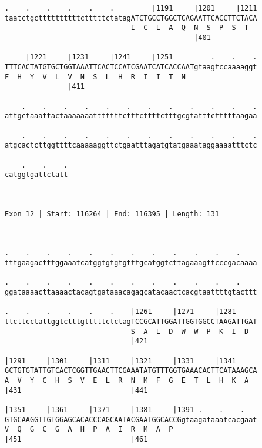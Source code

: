 \documentclass{article}
\begin{document}
\begin{Verbatim}
.    .    .    .    .    .         |1191     |1201     |1211
taatctgcttttttttttctttttctatagATCTGCCTGGCTCAGAATTCACCTTCTACA
                              I  C  L  A  Q  N  S  P  S  T  
                                             |401           
  
     |1221     |1231     |1241     |1251         .    .    .
TTTCACTATGTGCTGGTAAATTCACTCCATCGAATCATCACCAATgtaagtccaaaaggt
F  H  Y  V  L  V  N  S  L  H  R  I  I  T  N                 
               |411                                         
  
    .    .    .    .    .    .    .    .    .    .    .    .
attgctaaattactaaaaaaatttttttctttcttttctttgcgtatttctttttaagaa
                                                            
    .    .    .    .    .    .    .    .    .    .    .    .
atgcactcttggttttcaaaaaggttctgaatttagatgtatgaaataggaaaatttctc
                                                            
    .    .    .
catggtgattctatt
               
               
 
Exon 12 | Start: 116264 | End: 116395 | Length: 131



.    .    .    .    .    .    .    .    .    .    .    .    
tttgaagactttggaaatcatggtgtgtgtttgcatggtcttagaaagttcccgacaaaa
                                                            
.    .    .    .    .    .    .    .    .    .    .    .    
ggataaaacttaaaactacagtgataaacagagcatacaactcacgtaattttgtacttt
                                                            
.    .    .    .    .    .    |1261     |1271     |1281     
ttcttcctattggtctttgtttttctctagTCCGCATTGGATTGGTGGCCTAAGATTGAT
                              S  A  L  D  W  W  P  K  I  D  
                              |421                          
  
|1291     |1301     |1311     |1321     |1331     |1341     
GCTGTGTATTGTCACTCGGTTGAACTTCGAAATATGTTTGGTGAAACACTTCATAAAGCA
A  V  Y  C  H  S  V  E  L  R  N  M  F  G  E  T  L  H  K  A  
|431                          |441                          
  
|1351     |1361     |1371     |1381     |1391 .    .    .   
GTGCAAGGTTGTGGAGCACACCCAGCAATACGAATGGCACCGgtaagataaatcacgaat
V  Q  G  C  G  A  H  P  A  I  R  M  A  P                    
|451                          |461                          
  

\end{Verbatim}
\end{document}

